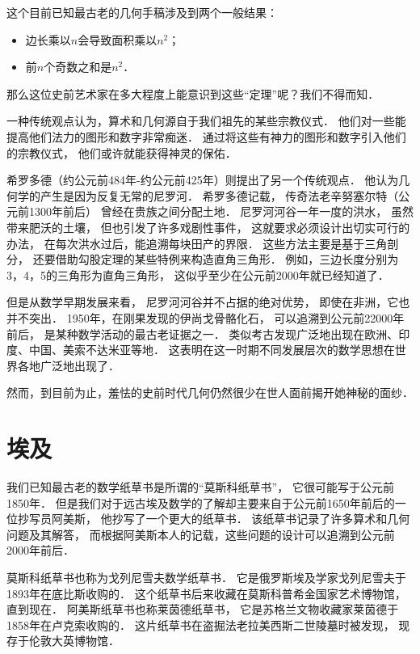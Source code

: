 \documentclass[cn,fancy,blue,11pt]{elegantbook}
\begin{document}
这个目前已知最古老的几何手稿涉及到两个一般结果：
\begin{itemize}
	\item 边长乘以$n$会导致面积乘以$n^2$；
	\item 前$n$个奇数之和是$n^2$．
\end{itemize}
那么这位史前艺术家在多大程度上能意识到这些``定理''呢？我们不得而知．

一种传统观点认为，算术和几何源自于我们祖先的某些宗教仪式．
他们对一些能提高他们法力的图形和数字非常痴迷．
通过将这些有神力的图形和数字引入他们的宗教仪式，
他们或许就能获得神灵的保佑．

希罗多德（约公元前484年-约公元前425年）则提出了另一个传统观点．
他认为几何学的产生是因为反复无常的尼罗河．
希罗多德记载，
传奇法老辛努塞尔特（公元前1300年前后）
曾经在贵族之间分配土地．
尼罗河河谷一年一度的洪水，
虽然带来肥沃的土壤，
但也引发了许多戏剧性事件，
这就要求必须设计出切实可行的办法，
在每次洪水过后，能追溯每块田产的界限．
这些方法主要是基于三角剖分，
还要借助勾股定理的某些特例来构造直角三角形．
例如，三边长度分别为3，4，5的三角形为直角三角形，
这似乎至少在公元前2000年就已经知道了．

但是从数学早期发展来看，
尼罗河河谷并不占据的绝对优势，
即使在非洲，它也并不突出．
1950年，在刚果发现的伊尚戈骨骼化石，
可以追溯到公元前22000年前后，
是某种数学活动的最古老证据之一．
类似考古发现广泛地出现在欧洲、印度、中国、美索不达米亚等地．
这表明在这一时期不同发展层次的数学思想在世界各地广泛地出现了．

然而，到目前为止，羞怯的史前时代几何仍然很少在世人面前揭开她神秘的面纱．

\section{埃及}

我们已知最古老的数学纸草书是所谓的``莫斯科纸草书''，
它很可能写于公元前1850年．
但是我们对于远古埃及数学的了解却主要来自于公元前1650年前后的一位抄写员阿美斯，
他抄写了一个更大的纸草书．
该纸草书记录了许多算术和几何问题及其解答，
而根据阿美斯本人的记载，这些问题的设计可以追溯到公元前2000年前后．

莫斯科纸草书也称为戈列尼雪夫数学纸草书．
它是俄罗斯埃及学家戈列尼雪夫于1893年在底比斯收购的．
这个纸草书后来收藏在莫斯科普希金国家艺术博物馆，直到现在．
阿美斯纸草书也称莱茵德纸草书，
它是苏格兰文物收藏家莱茵德于1858年在卢克索收购的．
这片纸草书在盗掘法老拉美西斯二世陵墓时被发现，
现存于伦敦大英博物馆．
\end{document}
